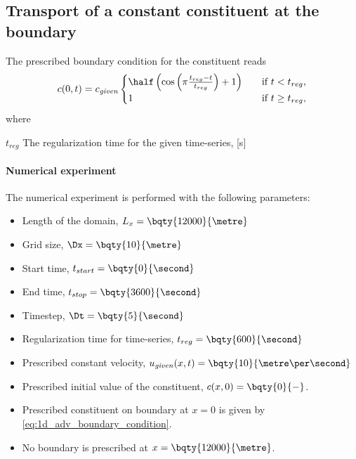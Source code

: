 \subsection{Transport of a constant constituent at the boundary} \label{sec:numerical_experiment_1d_adv_constant_boundary}
The prescribed boundary condition for the constituent reads
\begin{align}
    c(0,t) = c_{\it given}
    \begin{cases}
        \half \left(\cos\left(\pi \frac{t_{reg} - t}{t_{reg}} \right) + 1\right) &\quad \text{if } t < t_{reg},
        \\
        1 &\quad \text{if } t \geq t_{reg},
    \end{cases}
    \label{eq:1d_adv_boundary_condition}
\end{align}
where
\begin{symbollist}
    \item[$t_{reg}$] The regularization time for the given time-series, [\si{\second}]
\end{symbollist}
\paragraph*{Numerical experiment}
The numerical experiment is performed with the following parameters:
\begin{itemize}
    \item Length of the domain, $L_x = \bqty{12000}{\metre}$
    \item Grid size, $\Dx = \bqty{10}{\metre}$
    \item Start time, $t_{start} = \bqty{0}{\second}$
    \item End time, $t_{stop} = \bqty{3600}{\second}$
    \item Timestep, $\Dt = \bqty{5}{\second}$
    \item Regularization time for time-series, $t_{reg} = \bqty{600}{\second}$
    \item Prescribed constant velocity, $u_{\it given}(x,t) = \bqty{10}{\metre\per\second}$
    \item Prescribed initial value of the constituent, $c(x,0)= \bqty{0}{-}$.
    \item Prescribed constituent on boundary at $x=0$ is given by \autoref{eq:1d_adv_boundary_condition}.
    \item No boundary is prescribed at $x=\bqty{12000}{\metre}$.
\end{itemize}
